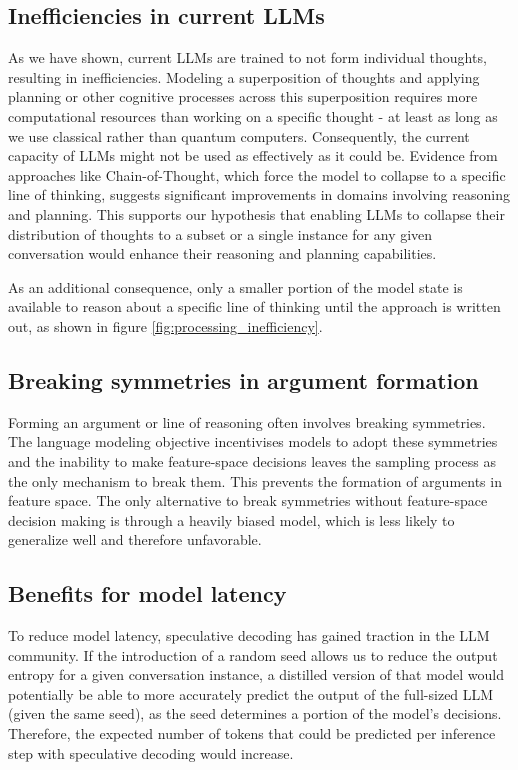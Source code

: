 \documentclass{article}
\begin{document}
\subsection{Inefficiencies in current LLMs}
As we have shown, current LLMs are trained to not form individual thoughts, resulting in inefficiencies. Modeling a superposition of thoughts and applying planning or other cognitive processes across this superposition requires more computational resources than working on a specific thought - at least as long as we use classical rather than quantum computers. Consequently, the current capacity of LLMs might not be used as effectively as it could be. Evidence from approaches like Chain-of-Thought, which force the model to collapse to a specific line of thinking, suggests significant improvements in domains involving reasoning and planning. This supports our hypothesis that enabling LLMs to collapse their distribution of thoughts to a subset or a single instance for any given conversation would enhance their reasoning and planning capabilities.

As an additional consequence, only a smaller portion of the model state is available to reason about a specific line of thinking until the approach is written out, as shown in figure \ref{fig:processing_inefficiency}.

\subsection{Breaking symmetries in argument formation}
Forming an argument or line of reasoning often involves breaking symmetries. The language modeling objective incentivises models to adopt these symmetries and the inability to make feature-space decisions leaves the sampling process as the only mechanism to break them. This prevents the formation of arguments in feature space. The only alternative to break symmetries without feature-space decision making is through a heavily biased model, which is less likely to generalize well and therefore unfavorable.

\subsection{Benefits for model latency}
To reduce model latency, speculative decoding has gained traction in the LLM community. If the introduction of a random seed allows us to reduce the output entropy for a given conversation instance, a distilled version of that model would potentially be able to more accurately predict the output of the full-sized LLM (given the same seed), as the seed determines a portion of the model's decisions. Therefore, the expected number of tokens that could be predicted per inference step with speculative decoding would increase.
\end{document}
